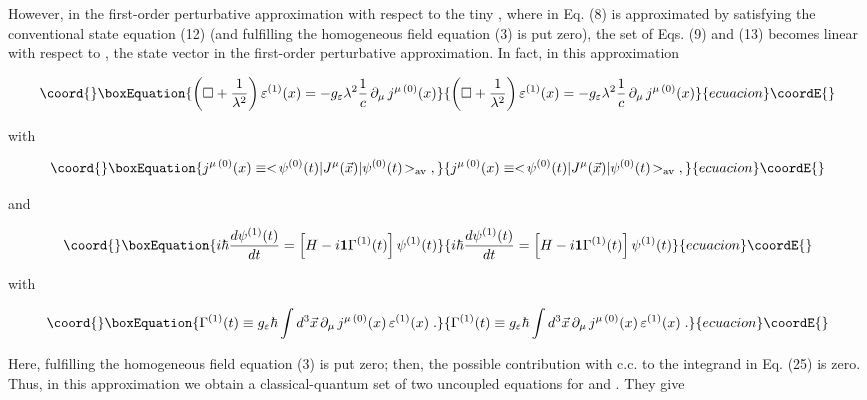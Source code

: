 \documentclass[a4paper,12pt]{article}
\begin{document}
However, in the first-order perturbative approximation with respect to the tiny \coordHE{}, where \coordHE{} in Eq. (8) is approximated by \coordHE{} satisfying the conventional state equation (12) (and \coordHE{} fulfilling the homogeneous field equation (3) is put zero), the set of Eqs. (9) and (13) becomes linear with respect to \coordHE{}, the state vector in the first-order perturbative approximation. In fact, in this approximation

\begin{equation}\coord{}\boxEquation{
\left( \Box + \frac{1}{\lambda^2}\right) \varepsilon^{(1)} (x) = -g_\varepsilon \lambda ^2 \frac{1}{c} \,\partial_\mu\, j^{\mu\,(0)}(x) 
}{
\left( \Box + \frac{1}{\lambda^2}\right) \varepsilon^{(1)} (x) = -g_\varepsilon \lambda ^2 \frac{1}{c} \,\partial_\mu\, j^{\mu\,(0)}(x) 
}{ecuacion}\coordE{}\end{equation}

\ni with

\begin{equation}\coord{}\boxEquation{
j^{\mu\,(0)}(x) \equiv <\!\psi^{(0)}(t)|J^\mu (\vec{x})|\psi^{(0)}(t)\!>_{\rm av}\;,
}{
j^{\mu\,(0)}(x) \equiv <\!\psi^{(0)}(t)|J^\mu (\vec{x})|\psi^{(0)}(t)\!>_{\rm av}\;,
}{ecuacion}\coordE{}\end{equation}

\ni and

\begin{equation}\coord{}\boxEquation{
i\hbar \frac{d\psi^{(1)}(t)}{dt} = \left[H - i{\bf 1} \Gamma^{(1)}(t) \right] \psi^{(1)}(t)
}{
i\hbar \frac{d\psi^{(1)}(t)}{dt} = \left[H - i{\bf 1} \Gamma^{(1)}(t) \right] \psi^{(1)}(t)
}{ecuacion}\coordE{}\end{equation}

\ni with

\begin{equation}\coord{}\boxEquation{
\Gamma^{(1)}(t) \equiv g_\varepsilon \hbar\int d^3\vec{x}\, \partial_\mu\, j^{\mu\,(0)}(x) \,\varepsilon^{(1)}(x)\;.
}{
\Gamma^{(1)}(t) \equiv g_\varepsilon \hbar\int d^3\vec{x}\, \partial_\mu\, j^{\mu\,(0)}(x) \,\varepsilon^{(1)}(x)\;.
}{ecuacion}\coordE{}\end{equation}

\ni Here, \coordHE{} fulfilling the homogeneous field equation (3) is put zero; then, the possible contribution \coordHE{} with \coordHE{} c.c. to the integrand in Eq. (25) is zero. Thus, in this approximation we obtain a classical-quantum set of two uncoupled equations for \coordHE{} and \coordHE{}. They give
\end{document}
